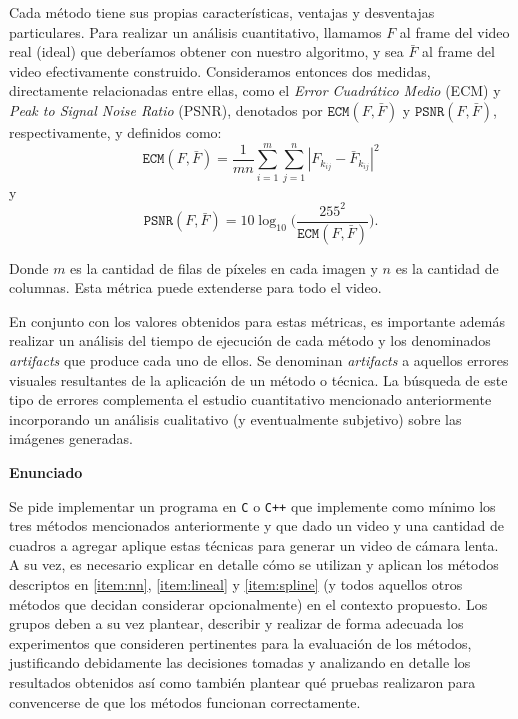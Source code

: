 Cada m\'etodo tiene sus propias caracter\'isticas, ventajas y desventajas particulares. Para realizar un an\'alisis cuantitativo, llamamos $F$ al frame del video real (ideal) que deber\'iamos obtener con nuestro algoritmo, y sea $\bar{F}$ al frame del video efectivamente construido. Consideramos entonces dos medidas, directamente relacionadas entre ellas, como el \emph{Error Cuadr\'atico Medio} (ECM) y \emph{Peak to Signal Noise Ratio} (PSNR), denotados por $\texttt{ECM}(F,\bar{F})$ y $\texttt{PSNR}(F,\bar{F})$, respectivamente, y definidos como:
\begin{equation}
\texttt{ECM}(F,\bar{F}) = \frac{1}{mn}\sum_{i=1}^m\sum_{j = 1}^n |F_{k_{ij}} - \bar{F}_{k_{ij}}|^2 \label{eq:ecm}
\end{equation}
\noindent y
\begin{equation}
\texttt{PSNR}(F,\bar{F}) = 10 \log_{10}\bigg(\frac{255^2}{\texttt{ECM}(F,\bar{F})}\bigg). \label{eq:psnr}
\end{equation}

Donde $m$ es la cantidad de filas de p\'ixeles en cada imagen y $n$ es la cantidad de columnas. Esta métrica puede extenderse para todo el video.

En conjunto con los valores obtenidos para estas m\'etricas, es importante además realizar un an\'alisis del tiempo de ejecuci\'on de cada m\'etodo y los denominados \emph{artifacts} que produce cada uno de ellos. Se denominan \emph{artifacts} a aquellos errores visuales resultantes de la aplicaci\'on de un m\'etodo o t\'ecnica. La b\'usqueda de este tipo de errores complementa el estudio cuantitativo mencionado anteriormente incorporando un an\'alisis cualitativo (y eventualmente subjetivo) sobre las im\'agenes generadas.

\vskip 5pt

{\bf\noindent Enunciado}

Se pide implementar un programa en \verb-C- o \verb-C++- que implemente como m\'inimo los tres m\'etodos mencionados anteriormente y que dado un video y una cantidad de cuadros a agregar aplique estas t\'ecnicas para generar un video de cámara lenta. A su vez, es necesario explicar en detalle c\'omo se utilizan y aplican los m\'etodos descriptos en \ref{item:nn}, \ref{item:lineal} y \ref{item:spline} (y todos aquellos otros m\'etodos que decidan considerar opcionalmente) en el contexto propuesto. Los grupos deben a su vez plantear, describir y realizar de forma adecuada los experimentos que consideren pertinentes para la evaluaci\'on de los m\'etodos, justificando debidamente las decisiones tomadas y analizando en detalle los resultados obtenidos as\'i como tambi\'en plantear qu\'e pruebas realizaron para convencerse de que los m\'etodos funcionan correctamente.


